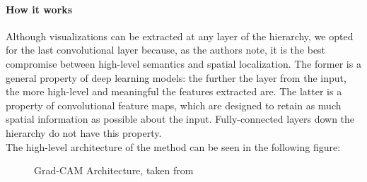 \documentclass[../main.tex]{subfiles}
\begin{document}
    \paragraph{How it works}

    Although visualizations can be extracted at any layer of the hierarchy, we opted for the last convolutional layer
    because, as the authors note, it is the best compromise between high-level semantics and spatial localization.
    The former is a general property of deep learning models: the further the layer from the input,
    the more high-level and meaningful the features extracted are. The latter is a property of
    convolutional feature maps, which are designed to retain as much spatial information as possible about
    the input. Fully-connected layers down the hierarchy do not have this property. \\
    The high-level architecture of the method can be seen in the following figure:

	\begin{figure}[h!]
        \centering{}
	    \caption{Grad-CAM Architecture, taken from~\cite{gradcam}}\label{fig:gradcam-architecture}
	\end{figure}
\end{document}
